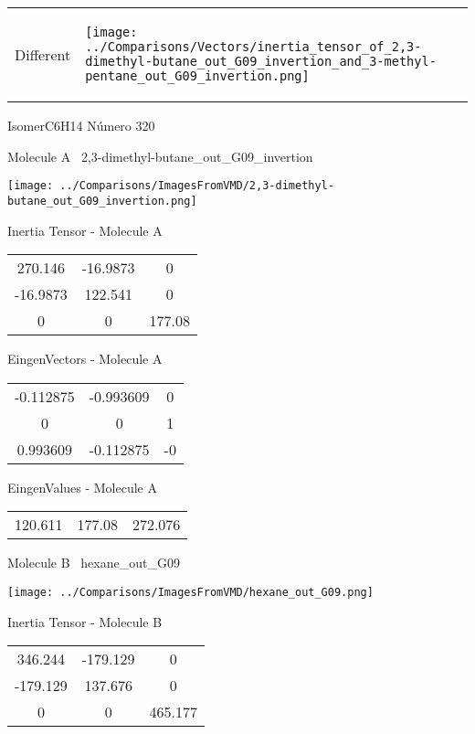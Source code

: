 \vtab[-5mm]
\begin{tabular}{*{2}{m{}}}
\begin{center}
\textcolor{NavyBlue}{\Large Different}
\end{center}
&
\begin{center}
\texttt{[image: ../Comparisons/Vectors/inertia\_tensor\_of\_2,3-dimethyl-butane\_out\_G09\_invertion\_and\_3-methyl-pentane\_out\_G09\_invertion.png]}
\end{center}
\end{tabular}

 \newpage

\vtab[-3cm]
\begin{center}
{\large IsomerC6H14 \tab Número 320}
\end{center}
\begin{multicols}{2}
\begin{center}

Molecule A \
2,3-dimethyl-butane\_out\_G09\_invertion

\texttt{[image: ../Comparisons/ImagesFromVMD/2,3-dimethyl-butane\_out\_G09\_invertion.png]}

Inertia Tensor - Molecule A \\
\begin{tabular}{|c c c|}
270.146	 & 	-16.9873	 & 	0	 \\
-16.9873	 & 	122.541	 & 	0	 \\
0	 & 	0	 & 	177.08
\end{tabular}

\vtab
 EingenVectors - Molecule A     \\
\begin{tabular}{|c c c|}
-0.112875	 & 	-0.993609	 & 	0	 \\
0	 & 	0	 & 	1	 \\
0.993609	 & 	-0.112875	 & 	-0
\end{tabular}

\vtab
 EingenValues - Molecule A     \\
\begin{tabular}{|c c c|}
120.611	 & 	177.08	 & 	272.076	 \\
\end{tabular}
\columnbreak

Molecule B \
hexane\_out\_G09

\texttt{[image: ../Comparisons/ImagesFromVMD/hexane\_out\_G09.png]}

Inertia Tensor - Molecule B \\
\begin{tabular}{|c c c|}
346.244	 & 	-179.129	 & 	0	 \\
-179.129	 & 	137.676	 & 	0	 \\
0	 & 	0	 & 	465.177
\end{tabular}


\end{center}
\end{multicols}

